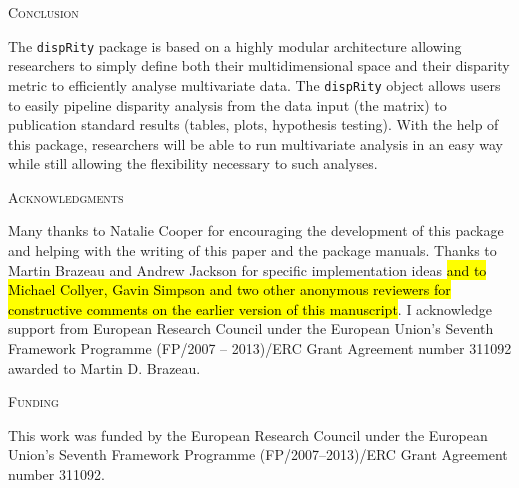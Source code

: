 \documentclass[12pt,letterpaper]{article}
\renewcommand{\section}[1]{%
\bigskip
\begin{center}
\begin{Large}
\normalfont\scshape #1
\medskip
\end{Large}
\end{center}}
\newcommand{\disp}{\texttt{dispRity} }
\begin{document}
\section{Conclusion}
The \disp package is based on a highly modular architecture allowing researchers to simply define both their multidimensional space and their disparity metric to efficiently analyse multivariate data.
The \disp object allows users to easily pipeline disparity analysis from the data input (the matrix) to publication standard results (tables, plots, hypothesis testing).
With the help of this package, researchers will be able to run multivariate analysis in an easy way while still allowing the flexibility necessary to such analyses.


\section{Acknowledgments}
Many thanks to Natalie Cooper for encouraging the development of this package and helping with the writing of this paper and the package manuals.
Thanks to Martin Brazeau and Andrew Jackson for specific implementation ideas \hl{and to Michael Collyer, Gavin Simpson and two other anonymous reviewers for constructive comments on the earlier version of this manuscript}. %
I acknowledge support from European Research Council under the European Union's Seventh Framework Programme (FP/2007 – 2013)/ERC Grant Agreement number 311092 awarded to Martin D. Brazeau.


\section{Funding}
This work was funded by the European Research Council under the European Union's Seventh Framework Programme (FP/2007–2013)/ERC Grant Agreement number 311092.



\end{document}
